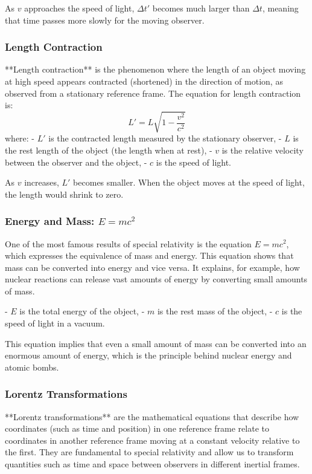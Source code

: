 \documentclass{article}
\begin{document}
As \( v \) approaches the speed of light, \( \Delta t' \) becomes much larger than \( \Delta t \), meaning that time passes more slowly for the moving observer.

\subsubsection*{Length Contraction}

**Length contraction** is the phenomenon where the length of an object moving at high speed appears contracted (shortened) in the direction of motion, as observed from a stationary reference frame. The equation for length contraction is:
\[
L' = L \sqrt{1 - \frac{v^2}{c^2}}
\]
where:
- \( L' \) is the contracted length measured by the stationary observer,
- \( L \) is the rest length of the object (the length when at rest),
- \( v \) is the relative velocity between the observer and the object,
- \( c \) is the speed of light.

As \( v \) increases, \( L' \) becomes smaller. When the object moves at the speed of light, the length would shrink to zero.

\subsubsection*{Energy and Mass: \( E = mc^2 \)}

One of the most famous results of special relativity is the equation \( E = mc^2 \), which expresses the equivalence of mass and energy. This equation shows that mass can be converted into energy and vice versa. It explains, for example, how nuclear reactions can release vast amounts of energy by converting small amounts of mass.

- \( E \) is the total energy of the object,
- \( m \) is the rest mass of the object,
- \( c \) is the speed of light in a vacuum.

This equation implies that even a small amount of mass can be converted into an enormous amount of energy, which is the principle behind nuclear energy and atomic bombs.

\subsubsection*{Lorentz Transformations}

**Lorentz transformations** are the mathematical equations that describe how coordinates (such as time and position) in one reference frame relate to coordinates in another reference frame moving at a constant velocity relative to the first. They are fundamental to special relativity and allow us to transform quantities such as time and space between observers in different inertial frames.
\end{document}
